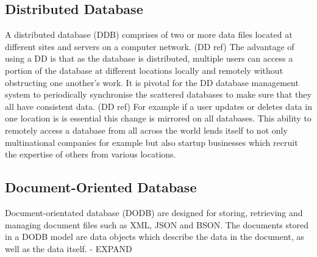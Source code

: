 \subsection{Distributed Database}\label{distributeddb}
A distributed database (DDB) comprises of two or more data files located at different sites and servers on a computer network. (DD ref) The advantage of using a DD is that as the database is distributed, multiple users can access a portion of the database at different locations locally and remotely without obstructing one another's work. It is  pivotal for the DD database management system to periodically synchronise the scattered databases to make sure that they all have consistent data. (DD ref) For example if a user updates or deletes data in one location is is essential this change is mirrored on all databases. This ability to remotely access a database from all across the world lends itself to not only multinational companies for example but also startup businesses which recruit the expertise of others from various locations.

\subsection{Document-Oriented Database}
Document-orientated database (DODB) are designed for storing, retrieving and managing document files such as XML, JSON and BSON. The documents stored in a DODB model are data objects which describe the data in the document, as well as the data itself. - EXPAND

